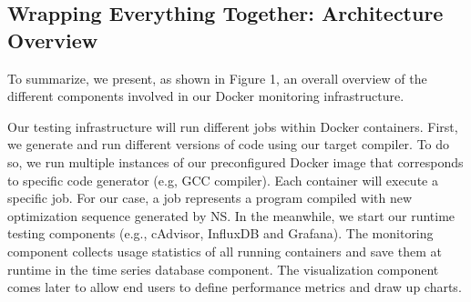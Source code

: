 \subsection{Wrapping Everything Together: Architecture Overview}
To summarize, we present, as shown in Figure 1, an overall overview of the different components involved in our Docker monitoring infrastructure.




Our testing infrastructure will run different jobs within Docker containers. First, we generate and run different versions of code using our target compiler. To do so, we run multiple instances of our preconfigured Docker image that corresponds to specific code generator (e.g, GCC compiler). Each container will execute a specific job. For our case, a job represents a program compiled with new optimization sequence generated by NS. In the meanwhile, we start our runtime testing components (e.g., cAdvisor, InfluxDB and Grafana). The monitoring component collects usage statistics of all running containers and save them at runtime in the time series database component. The visualization component comes later to allow end users to define performance metrics and draw up charts.
